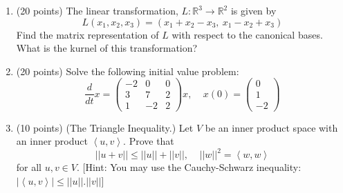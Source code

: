 \documentclass[fleqn]{article}
\begin{document}
\begin{enumerate}
    \item (20 points) The linear transformation, $L:\mathbb{R}^3 \rightarrow \mathbb{R}^2$ is given by 
    $$
      L(x_1, x_2, x_3)=\left(x_1+x_2-x_3, ~ x_1-x_2+x_3\right)
    $$ 
    Find the matrix representation of $L$ with respect to the canonical bases. What is the kurnel
    of this transformation?

            

    \item (20 points) Solve the following initial value problem:
    $$
      \dfrac{d}{dt}x=\begin{pmatrix}
        -2 & 0 & 0
        \\
        3 & 7 & 2
        \\
        1 & -2 & 2
      \end{pmatrix}x, ~~~~~ x(0)=\begin{pmatrix}
        0
        \\
        1
        \\
        -2
      \end{pmatrix}
    $$

            


    \item (10 points) (The Triangle Inequality.) Let $V$ be an inner product space with an inner product
    $\left\langle u, v\right\rangle$. Prove that 
    $$
      ||u+v|| \leq ||u||+||v||, ~~~~~ ||w||^2=\left\langle w, w\right\rangle
    $$
    for all $u,v \in V$.  [Hint: You may use the Cauchy-Schwarz inequality: $|\left\langle u, v\right\rangle | \leq ||u||.||v||$]

          


  \end{enumerate}
\end{document}
